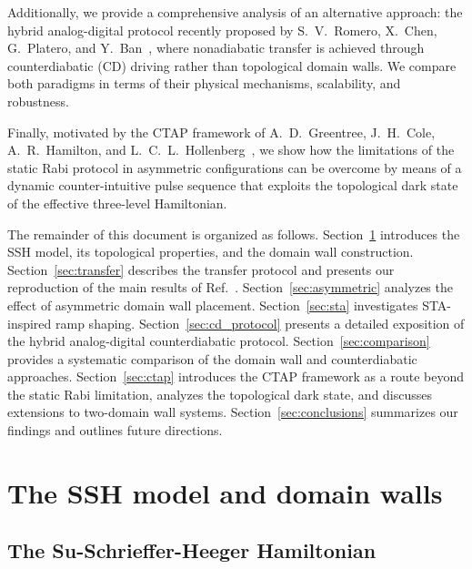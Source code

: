 \documentclass[
  reprint,
  amsmath,
  amssymb,
  aps,
  prb,
  floatfix,
  longbibliography,
]{revtex4-2}
\begin{document}
Additionally, we provide a comprehensive analysis of an alternative approach:
the hybrid analog-digital protocol recently proposed by
S.~V.~Romero, X.~Chen, G.~Platero, and Y.~Ban~\cite{Romero2024}, where nonadiabatic transfer is
achieved through counterdiabatic (CD) driving rather than topological domain
walls. We compare both paradigms in terms of their physical mechanisms,
scalability, and robustness.

Finally, motivated by the CTAP framework of
A.~D.~Greentree, J.~H.~Cole, A.~R.~Hamilton, and L.~C.~L.~Hollenberg~\cite{Greentree2004},
we show how the limitations of the static Rabi protocol in asymmetric
configurations can be overcome by means of a dynamic counter-intuitive pulse
sequence that exploits the topological dark state of the effective three-level
Hamiltonian.

The remainder of this document is organized as follows.
Section~\ref{sec:model} introduces the SSH model, its topological properties,
and the domain wall construction. Section~\ref{sec:transfer} describes the
transfer protocol and presents our reproduction of the main results
of Ref.~\cite{Zurita2023}. Section~\ref{sec:asymmetric} analyzes the effect of
asymmetric domain wall placement. Section~\ref{sec:sta} investigates
STA-inspired ramp shaping.
Section~\ref{sec:cd_protocol} presents a detailed exposition of the hybrid
analog-digital counterdiabatic protocol. Section~\ref{sec:comparison} provides
a systematic comparison of the domain wall and counterdiabatic approaches.
Section~\ref{sec:ctap} introduces the CTAP framework as a route beyond the
static Rabi limitation, analyzes the topological dark state, and discusses
extensions to two-domain wall systems.
Section~\ref{sec:conclusions} summarizes our findings and outlines future
directions.

\section{The SSH model and domain walls}
\label{sec:model}

\subsection{The Su-Schrieffer-Heeger Hamiltonian}
\label{sec:ssh}
\end{document}
